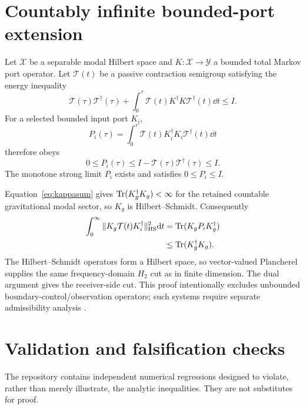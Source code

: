 \appendix

\section{Countably infinite bounded-port extension}
\label{app:infinite}

Let $\mathcal X$ be a separable modal Hilbert space and $K:\mathcal X\rightarrow\mathcal Y$ a bounded total Markov port operator.  Let $\mathcal T(t)$ be a passive contraction semigroup satisfying the energy inequality
\begin{equation}
\mathcal T(\tau)\mathcal T^\dagger(\tau)
+\int_0^\tau
\mathcal T(t)K^\dagger K\mathcal T^\dagger(t)\dd t
\le I .
\end{equation}
For a selected bounded input port $K_i$,
\begin{equation}
P_i(\tau)=\int_0^\tau
\mathcal T(t)K_i^\dagger K_i\mathcal T^\dagger(t)\dd t
\end{equation}
therefore obeys
\begin{equation}
0\le P_i(\tau)
\le I-\mathcal T(\tau)\mathcal T^\dagger(\tau)
\le I .
\end{equation}
The monotone strong limit $P_i$ exists and satisfies $0\le P_i\le I$.

Equation~\eqref{eq:kappasum} gives $\operatorname{Tr}(K_g^\dagger K_g)<\infty$ for the retained countable gravitational modal sector, so $K_g$ is Hilbert--Schmidt.  Consequently
\begin{align}
\int_0^\infty
\|K_g\mathcal T(t)K_i^\dagger\|_{\mathrm{HS}}^2\mathrm d t
&=\operatorname{Tr}(K_gP_iK_g^\dagger)\\
&\le\operatorname{Tr}(K_g^\dagger K_g).
\end{align}
The Hilbert--Schmidt operators form a Hilbert space, so vector-valued Plancherel supplies the same frequency-domain $H_2$ cut as in finite dimension.  The dual argument gives the receiver-side cut.  This proof intentionally excludes unbounded boundary-control/observation operators; such systems require separate admissibility analysis \cite{BarasBrockett1975,Opmeer2013}.

\section{Validation and falsification checks}
\label{app:validation}

The repository contains independent numerical regressions designed to violate, rather than merely illustrate, the analytic inequalities.  They are not substitutes for proof.

